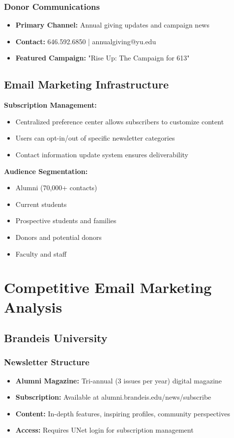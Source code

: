 \documentclass[12pt,letterpaper]{article}
\begin{document}
\subsubsection{Donor Communications}
\begin{itemize}[leftmargin=*]
    \item \textbf{Primary Channel:} Annual giving updates and campaign news
    \item \textbf{Contact:} 646.592.6850 | annualgiving@yu.edu
    \item \textbf{Featured Campaign:} "Rise Up: The Campaign for 613"
\end{itemize}

\subsection{Email Marketing Infrastructure}

\textbf{Subscription Management:}
\begin{itemize}[leftmargin=*]
    \item Centralized preference center allows subscribers to customize content
    \item Users can opt-in/out of specific newsletter categories
    \item Contact information update system ensures deliverability
\end{itemize}

\textbf{Audience Segmentation:}
\begin{itemize}[leftmargin=*]
    \item Alumni (70,000+ contacts)
    \item Current students
    \item Prospective students and families
    \item Donors and potential donors
    \item Faculty and staff
\end{itemize}

\section{Competitive Email Marketing Analysis}

\subsection{Brandeis University}

\subsubsection{Newsletter Structure}
\begin{itemize}[leftmargin=*]
    \item \textbf{Alumni Magazine:} Tri-annual (3 issues per year) digital magazine
    \item \textbf{Subscription:} Available at alumni.brandeis.edu/news/subscribe
    \item \textbf{Content:} In-depth features, inspiring profiles, community perspectives
    \item \textbf{Access:} Requires UNet login for subscription management
\end{itemize}
\end{document}
